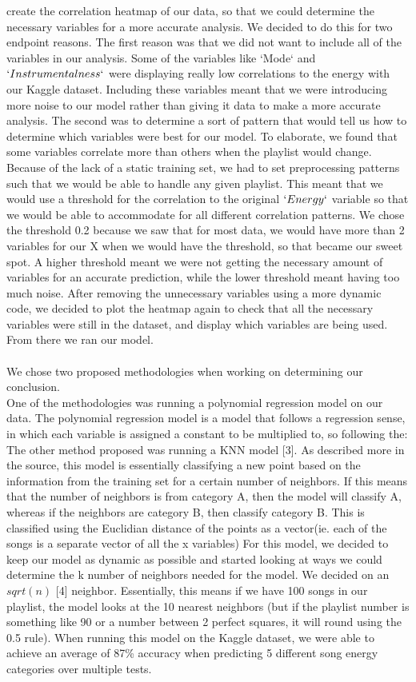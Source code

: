 \documentclass[titlepage]{article}
\begin{document}
create the correlation heatmap of our data, so that we could determine the necessary variables for a more accurate analysis. We decided to do this for two endpoint reasons. The first reason was that we did not want to include all of the variables in our analysis. Some of the variables like `Mode` and $`Instrumentalness`$ were displaying really low correlations to the energy with our Kaggle dataset. Including these variables meant that we were introducing more noise to our model rather than giving it data to make a more accurate analysis. The second was to determine a sort of pattern that would tell us how to determine which variables were best for our model. To elaborate, we found that some variables correlate more than others when the playlist would change. Because of the lack of a static training set, we had to set preprocessing patterns such that we would be able to handle any given playlist. This meant that we would use a threshold for the correlation to the original $`Energy`$ variable so that we would be able to accommodate for all different correlation patterns. We chose the threshold 0.2 because we saw that for most data, we would have more than 2 variables for our X when we would have the threshold, so that became our sweet spot. A higher threshold meant we were not getting the necessary amount of variables for an accurate prediction, while the lower threshold meant having too much noise. After removing the unnecessary variables using a more dynamic code, we decided to plot the heatmap again to check that all the necessary variables were still in the dataset, and display which variables are being used. From there we ran our model.
\\\\
We chose two proposed methodologies when working on determining our conclusion. 
\\
One of the methodologies was running a polynomial regression model on our data.
The polynomial regression model is a model that follows a regression sense, in which each variable is assigned a constant to be multiplied to, so following the:
\\
The other method proposed was running a KNN model [3]. As described more in the source, this model is essentially classifying a new point based on the information from the training set for a certain number of neighbors. If this means that the number of neighbors is from category A, then the model will classify A, whereas if the neighbors are category B, then classify category B. This is classified using the Euclidian distance of the points as a vector(ie. each of the songs is a separate vector of all the x variables) For this model, we decided to keep our model as dynamic as possible and started looking at ways we could determine the k number of neighbors needed for the model. We decided on an $sqrt(n)$ [4] neighbor. Essentially, this means if we have 100 songs in our playlist, the model looks at the 10 nearest neighbors (but if the playlist number is something like 90 or a number between 2 perfect squares, it will round using the 0.5 rule). When running this model on the Kaggle dataset, we were able to achieve an average of 87\% accuracy when predicting 5 different song energy categories over multiple tests. 
\end{document}
